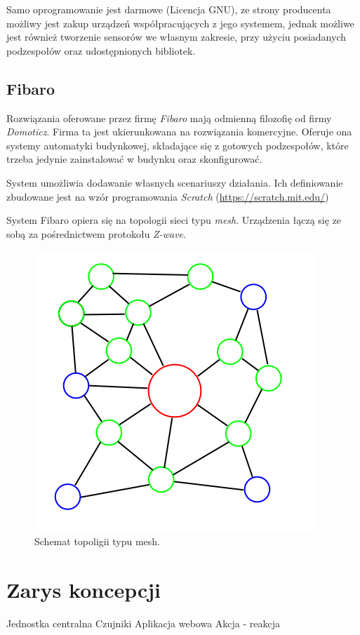 \documentclass[eng,oneside]{mgr}
\begin{document}
Samo oprogramowanie jest darmowe (Licencja GNU), ze strony producenta możliwy jest zakup urządzeń współpracujących z jego systemem, jednak możliwe jest również tworzenie sensorów we własnym zakresie, przy użyciu posiadanych podzespołów oraz udostępnionych bibliotek.
\subsection{Fibaro}                                                                                              
Rozwiązania oferowane przez firmę \textit{Fibaro} mają odmienną filozofię od firmy \textit{Domoticz}. Firma ta jest ukierunkowana na rozwiązania komercyjne. Oferuje ona systemy automatyki budynkowej, składające się z gotowych podzespołów, które trzeba jedynie zainstalować w budynku oraz skonfigurować.

System umożliwia dodawanie własnych scenariuszy działania. Ich definiowanie zbudowane jest na wzór programowania \textit{Scratch} (\url{https://scratch.mit.edu/})

System Fibaro opiera się na topologii sieci typu \textit{mesh}. Urządzenia łączą się ze sobą za pośrednictwem protokołu \textit{Z-wave}.
\begin{figure}[h]
\centering
\includegraphics[width=0.7\linewidth]{mesh}
\caption{Schemat topoligii typu mesh.}
\label{fig:Mesh-Network}
\end{figure}

\section{Zarys koncepcji}
Jednostka centralna
Czujniki
Aplikacja webowa
Akcja - reakcja
\end{document}
